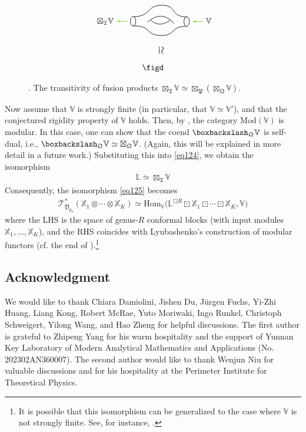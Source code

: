 \documentclass[11pt,b5paper,notitlepage]{article}
\theoremstyle{definition}
\theoremstyle{plain}
\newcommand{\fk}{\mathfrak}
\newcommand{\Hom}{\mathrm{Hom}}
\newcommand{\mbb}{\mathbb}
\newcommand{\blt}{\bullet}
\newcommand{\Vbb}{\mathbb V}
\newcommand{\Xbb}{\mathbb X}
\newcommand{\<}{\left\langle}
\renewcommand{\>}{\right\rangle}
\newcommand{\ST}{\mathscr{T}}
\newcommand{\bbs}{\boxbackslash}
\newcommand{\fq}{{\mathfrak Q}}
\newcommand{\Mod}{\mathrm{Mod}}
\newcommand{\fp}{\mathfrak{P}}
\newcommand{\fy}{\mathfrak{Y}}
\numberwithin{equation}{section}
\begin{document}
\begin{figure}[h]

	\centering
\begin{gather*}
\figc\\
\qquad\rotatebox{-90}{\scalebox{1.3}{$\simeq$}~~}\\
\figd
\end{gather*}


	\caption{. The transitivity of fusion products $\boxtimes_{\fk T}\Vbb\simeq\boxtimes_\fp(\boxtimes_\fq\Vbb)$.}
	\label{fig5}
\end{figure} 



Now assume that $\Vbb$ is strongly finite (in particular, that $\Vbb\simeq\Vbb'$), and that the conjectured rigidity property of $\Vbb$ holds. Then, by \cite{McR21-rational}, the category $\Mod(\Vbb)$ is modular. In this case, one can show that the coend $\bbs_\fq\Vbb$ is self-dual, i.e., $\bbs_\fq\Vbb\simeq\boxtimes_\fq\Vbb$. (Again, this will be explained in more detail in a future work.) Substituting this into \eqref{eq124}, we obtain the isomorphism
\begin{align*}
\mbb L\simeq\boxtimes_{\fk T}\Vbb
\end{align*}
Consequently, the isomorphism \eqref{eq125} becomes
\begin{align}\label{eq126}
\ST^*_{\fy_{p_\blt}}(\Xbb_1\otimes\cdots\otimes\Xbb_K)\simeq\Hom_\Vbb\big(\mbb L^{\boxdot R}\boxdot\Xbb_1\boxdot\cdots\boxdot\Xbb_K,\Vbb\big)
\end{align}
where the LHS is the space of genus-$R$ conformal blocks (with input modules $\Xbb_1,\dots,\Xbb_K$), and the RHS coincides with Lyubashenko's construction of modular functors (cf. the end of \cite[Sec. 8.2]{Lyu96-Ribbon}).\footnote{It is possible that this isomorphism can be generalized to the case where $\Vbb$ is not strongly finite. See, for instance, \cite[Rem. 8.7]{BW22-MFFH}.} 






\subsection*{Acknowledgment}



We would like to thank Chiara Damiolini, Jishen Du, J\"urgen Fuchs, Yi-Zhi Huang, Liang Kong, Robert McRae, Yuto Moriwaki, Ingo Runkel, Christoph Schweigert, Yilong Wang, and Hao Zheng for helpful discussions. The first author is grateful to Zhipeng Yang for his warm hospitality and the support of Yunnan Key Laboratory of Modern Analytical Mathematics and Applications (No. 202302AN360007). The second author would like to thank Wenjun Niu for valuable discussions and for his hospitality at the Perimeter Institute for Theoretical Physics.
\end{document}
